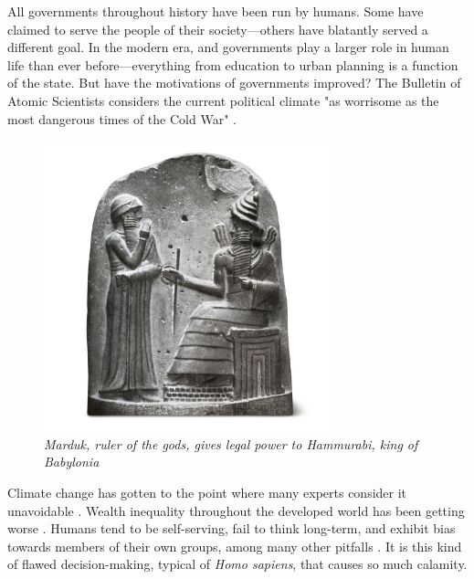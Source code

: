 \documentclass[12pt]{article}
\newenvironment{quote_1in}%
  {\list{}{\leftmargin=1in\rightmargin=1in}\item[]}%
  {\endlist}
\begin{document}
All governments throughout history have been run by humans. Some have claimed to serve the people of their society---others have blatantly served a different goal.
In the modern era, and governments play a larger role in human life than ever before---everything from education to urban planning is a function of the state. But have the motivations of governments improved? The Bulletin of Atomic Scientists considers the current political climate "as worrisome as the most dangerous times of the Cold War" \cite{mecklin2019new}.
\begin{figure}[ht]
\centering
\includegraphics[width=0.75\textwidth]{babylon.jpg}
\begin{quote_1in}
    \caption{
    \textit{Marduk, ruler of the gods, gives legal power to Hammurabi, king of Babylonia} \cite{babylon}}
\end{quote_1in}
\end{figure}
Climate change has gotten to the point where many experts consider it unavoidable \cite{ghosh2018great}. Wealth inequality throughout the developed world has been getting worse \cite{knight2017wealth}. %
Humans tend to be self-serving, fail to think long-term, and exhibit bias towards members of their own groups, among many other pitfalls \cite{haselton2006paranoid}.
It is this kind of flawed decision-making, typical of \textit{Homo sapiens}, that causes so much calamity.
\end{document}
